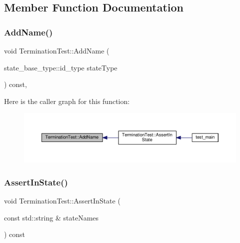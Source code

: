 \subsection{Member Function Documentation}
\mbox{\label{struct_termination_test_adbc9e083971e138c6ce231d4b1287a80}} 
\subsubsection{\texorpdfstring{Add\+Name()}{AddName()}}
{\footnotesize\ttfamily void Termination\+Test\+::\+Add\+Name (\begin{DoxyParamCaption}\item[{state\+\_\+base\+\_\+type\+::id\+\_\+type}]{state\+Type }\end{DoxyParamCaption}) const\hspace{0.3cm}{\ttfamily [inline]}, {\ttfamily [private]}}

Here is the caller graph for this function\+:
\nopagebreak
\begin{figure}[H]
\begin{center}
\leavevmode
\includegraphics[width=350pt]{struct_termination_test_adbc9e083971e138c6ce231d4b1287a80_icgraph}
\end{center}
\end{figure}
\mbox{\label{struct_termination_test_aec947c03a7b1bfbc20a93cc0e7434381}} 
\subsubsection{\texorpdfstring{Assert\+In\+State()}{AssertInState()}}
{\footnotesize\ttfamily void Termination\+Test\+::\+Assert\+In\+State (\begin{DoxyParamCaption}\item[{const std\+::string \&}]{state\+Names }\end{DoxyParamCaption}) const\hspace{0.3cm}{\ttfamily [inline]}}

